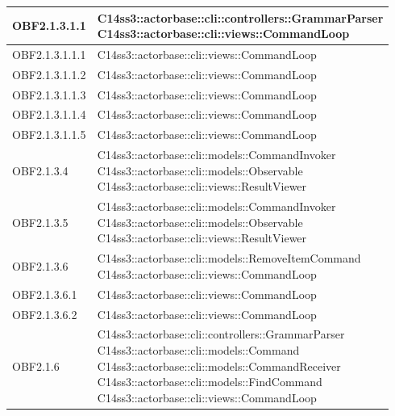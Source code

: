 \documentclass{scalatekids-article}
\begin{document}
\begin{longtable}[H]{|p{4.5cm}|p{13cm}|}
\hline
OBF2.1.3.1.1 & \multiLineCell[t]{C14ss3::actorbase::cli::controllers::GrammarParser\\C14ss3::actorbase::cli::views::CommandLoop\\}\\
\hline
OBF2.1.3.1.1.1 & \multiLineCell[t]{C14ss3::actorbase::cli::views::CommandLoop\\}\\
\hline
OBF2.1.3.1.1.2 & \multiLineCell[t]{C14ss3::actorbase::cli::views::CommandLoop\\}\\
\hline
OBF2.1.3.1.1.3 & \multiLineCell[t]{C14ss3::actorbase::cli::views::CommandLoop\\}\\
\hline
OBF2.1.3.1.1.4 & \multiLineCell[t]{C14ss3::actorbase::cli::views::CommandLoop\\}\\
\hline
OBF2.1.3.1.1.5 & \multiLineCell[t]{C14ss3::actorbase::cli::views::CommandLoop\\}\\
\hline
OBF2.1.3.4 & \multiLineCell[t]{C14ss3::actorbase::cli::models::CommandInvoker\\C14ss3::actorbase::cli::models::Observable\\C14ss3::actorbase::cli::views::ResultViewer\\}\\
\hline
OBF2.1.3.5 & \multiLineCell[t]{C14ss3::actorbase::cli::models::CommandInvoker\\C14ss3::actorbase::cli::models::Observable\\C14ss3::actorbase::cli::views::ResultViewer\\}\\
\hline
OBF2.1.3.6 & \multiLineCell[t]{C14ss3::actorbase::cli::models::RemoveItemCommand\\C14ss3::actorbase::cli::views::CommandLoop\\}\\
\hline
OBF2.1.3.6.1 & \multiLineCell[t]{C14ss3::actorbase::cli::views::CommandLoop\\}\\
\hline
OBF2.1.3.6.2 & \multiLineCell[t]{C14ss3::actorbase::cli::views::CommandLoop\\}\\
\hline
OBF2.1.6 & \multiLineCell[t]{C14ss3::actorbase::cli::controllers::GrammarParser\\C14ss3::actorbase::cli::models::Command\\C14ss3::actorbase::cli::models::CommandReceiver\\C14ss3::actorbase::cli::models::FindCommand\\C14ss3::actorbase::cli::views::CommandLoop\\}\\

\end{longtable}
\end{document}
